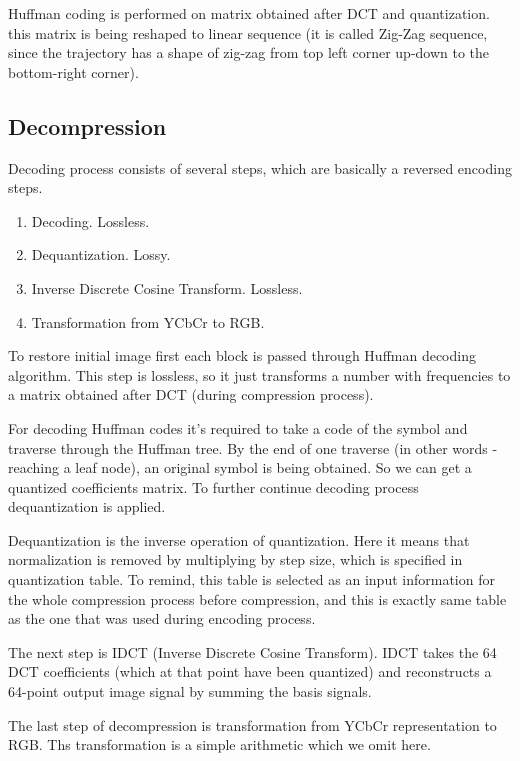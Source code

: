 Huffman coding is performed on matrix obtained after DCT and quantization. this matrix is being reshaped to linear sequence (it is called Zig-Zag sequence, since the trajectory has a shape of zig-zag from top left corner up-down to the bottom-right corner).

\subsection{Decompression}

Decoding process consists of several steps, which are basically a reversed encoding steps.

\begin{enumerate}
    \item Decoding. Lossless.
    \item Dequantization. Lossy.
    \item Inverse Discrete Cosine Transform. Lossless.
    \item Transformation from YCbCr to RGB.
\end{enumerate}

To restore initial image first each block is passed through Huffman decoding algorithm. This step is lossless, so it just transforms a number with frequencies to a matrix obtained after DCT (during compression process).

For decoding Huffman codes it's required to take a code of the symbol and traverse through the Huffman tree. By the end of one traverse (in other words - reaching a leaf node), an original symbol is being obtained. So we can get a quantized coefficients matrix. To further continue decoding process dequantization is applied.

Dequantization is the inverse operation of quantization. Here it means that normalization is removed by multiplying by step size, which is specified in quantization table. To remind, this table is selected as an input information for the whole compression process before compression, and this is exactly same table as the one that was used during encoding process.

The next step is IDCT (Inverse Discrete Cosine Transform). IDCT takes the 64 DCT coefficients (which at that point have been quantized) and reconstructs a 64-point output image signal by summing the basis signals.

The last step of decompression is transformation from YCbCr representation to RGB. Ths transformation is a simple arithmetic which we omit here.

